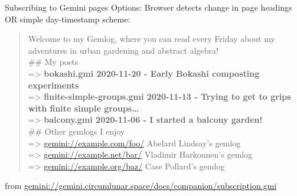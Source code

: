 \documentclass[presentation, 11pt,  aspectratio=169]{beamer}
\renewcommand{\alert}[1]{\textbf{\textcolor{mydarkred}{#1}}}
\begin{document}
\begin{frame}[label={sec:org02d3bba}]{Subscribing to Gemini pages}
Options: Browser detects change in page headings OR simple day-timestamp scheme:\\
\begin{footnotesize}
\begin{quote}
Welcome to my Gemlog, where you can read every Friday about my adventures in urban gardening and abstract algebra!\\

\#\# My posts\\
=> \alert{bokashi.gmi              2020-11-20 - Early Bokashi composting experiments}\\
=> \alert{finite-simple-groups.gmi 2020-11-13 - Trying to get to grips with finite simple groups\ldots{}}\\
=> \alert{balcony.gmi              2020-11-06 - I started a balcony garden!}\\

\#\# Other gemlogs I enjoy\\
=> \href{gemini://example.com/foo/}{gemini://example.com/foo/}    Abelard Lindsay's gemlog\\
=> \href{gemini://example.net/bar/}{gemini://example.net/bar/}    Vladimir Harkonnen's gemlog\\
=> \href{gemini://example.org/baz/}{gemini://example.org/baz/}    Case Pollard's gemlog\\
\end{quote}
\end{footnotesize}
from \href{gemini://gemini.circumlunar.space/docs/companion/subscription.gmi}{gemini://gemini.circumlunar.space/docs/companion/subscription.gmi}\\
\end{frame}
\end{document}
